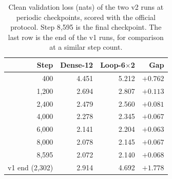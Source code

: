 \begin{table}[t]
\centering
\caption{Clean validation loss (nats) of the two v2 runs at periodic checkpoints, scored with the official protocol. Step 8{,}595 is the final checkpoint. The last row is the end of the v1 runs, for comparison at a similar step count.}
\label{tab:curve}
\begin{tabular}{rrrr}
\toprule
Step & Dense-12 & Loop-6$\times$2 & Gap \\
\midrule
400 & 4.451 & 5.212 & $+0.762$ \\
1,200 & 2.694 & 2.807 & $+0.113$ \\
2,400 & 2.479 & 2.560 & $+0.081$ \\
4,000 & 2.278 & 2.345 & $+0.067$ \\
6,000 & 2.141 & 2.204 & $+0.063$ \\
8,000 & 2.078 & 2.145 & $+0.067$ \\
8,595 & 2.072 & 2.140 & $+0.068$ \\
\midrule
v1 end (2,302) & 2.914 & 4.692 & $+1.778$ \\
\bottomrule
\end{tabular}
\end{table}

